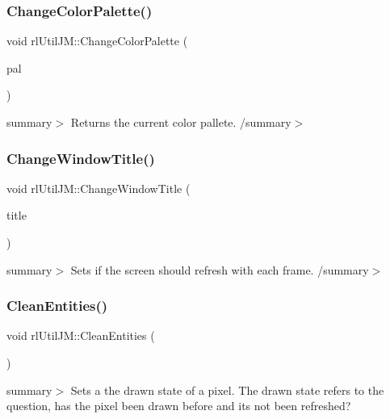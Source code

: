 \subsubsection{\texorpdfstring{Change\+Color\+Palette()}{ChangeColorPalette()}}
{\footnotesize\ttfamily void rl\+Util\+J\+M\+::\+Change\+Color\+Palette (\begin{DoxyParamCaption}\item[{const \hyperlink{class_color_palette}{Color\+Palette} \&}]{pal }\end{DoxyParamCaption})\hspace{0.3cm}{\ttfamily [static]}}

summary$>$ Returns the current color pallete. /summary$>$ \mbox{\label{classrl_util_j_m_a7cb21b69316862af266fbd085ea80f97}} 
\subsubsection{\texorpdfstring{Change\+Window\+Title()}{ChangeWindowTitle()}}
{\footnotesize\ttfamily void rl\+Util\+J\+M\+::\+Change\+Window\+Title (\begin{DoxyParamCaption}\item[{const char $\ast$}]{title }\end{DoxyParamCaption})\hspace{0.3cm}{\ttfamily [static]}}

summary$>$ Sets if the screen should refresh with each frame. /summary$>$ \mbox{\label{classrl_util_j_m_aa04c7a7bc0538a74f79acd2b37c497c6}} 
\subsubsection{\texorpdfstring{Clean\+Entities()}{CleanEntities()}}
{\footnotesize\ttfamily void rl\+Util\+J\+M\+::\+Clean\+Entities (\begin{DoxyParamCaption}{ }\end{DoxyParamCaption})\hspace{0.3cm}{\ttfamily [static]}}

summary$>$ Sets a the drawn state of a pixel. The drawn state refers to the question, has the pixel been drawn before and its not been refreshed?

